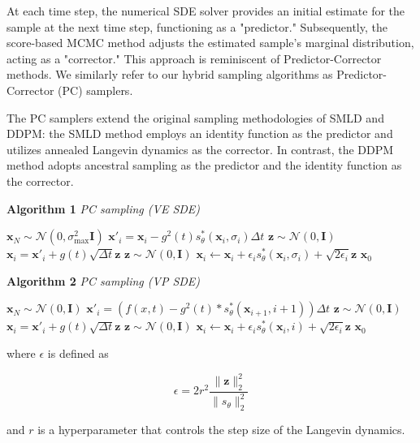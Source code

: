 At each time step, the numerical SDE solver provides an initial estimate for the sample at the next time step, functioning as a "predictor." Subsequently, the score-based MCMC method adjusts the estimated sample's marginal distribution, acting as a "corrector." This approach is reminiscent of Predictor-Corrector methods. We similarly refer to our hybrid sampling algorithms as Predictor-Corrector (PC) samplers.

The PC samplers extend the original sampling methodologies of SMLD and DDPM: the SMLD method employs an identity function as the predictor and utilizes annealed Langevin dynamics as the corrector. In contrast, the DDPM method adopts ancestral sampling as the predictor and the identity function as the corrector.

\noindent\textbf{Algorithm 1} \textit{PC sampling (VE SDE)}
\begin{algorithmic}[1]
    \STATE $\mathbf{x}_N \sim \mathcal{N}(0, \sigma_{\max}^2 \mathbf{I})$
        \STATE $\mathbf{x}'_i = \mathbf{x}_i -g^2(t)s_\theta^* \left( \mathbf{x}_i, \sigma_i \right) {\Delta t}$
        \STATE $\mathbf{z} \sim \mathcal{N}(0, \mathbf{I})$
        \STATE $\mathbf{x}_i = \mathbf{x}'_i +g(t) \sqrt{\Delta t} \mathbf{z}$
            \STATE $\mathbf{z} \sim \mathcal{N}(0, \mathbf{I})$
            \STATE $\mathbf{x}_i \leftarrow \mathbf{x}_i + \epsilon_i s_\theta^* \left( \mathbf{x}_i, \sigma_i \right) + \sqrt{2 \epsilon_i} \mathbf{z}$
        \ENDFOR
    \ENDFOR
    \RETURN $\mathbf{x}_0$
\end{algorithmic}

\bigskip

\noindent\textbf{Algorithm 2} \textit{PC sampling (VP SDE)}
\begin{algorithmic}[1]
    \STATE $\mathbf{x}_N \sim \mathcal{N}(0, \mathbf{I})$
        \STATE $\mathbf{x}'_i = (f(x,t)-g^2(t)*s_\theta^* \left( \mathbf{x}_{i+1}, i+1 \right)) {\Delta t}$
        \STATE $\mathbf{z} \sim \mathcal{N}(0, \mathbf{I})$
        \STATE $\mathbf{x}_i = \mathbf{x}'_i +g(t) \sqrt{\Delta t} \mathbf{z}$
            \STATE $\mathbf{z} \sim \mathcal{N}(0, \mathbf{I})$
            \STATE $\mathbf{x}_i \leftarrow \mathbf{x}_i + \epsilon_i s_\theta^* \left( \mathbf{x}_i, i \right) + \sqrt{2 \epsilon_i} \mathbf{z}$
        \ENDFOR
    \ENDFOR
    \RETURN $\mathbf{x}_0$
\end{algorithmic}

where $\epsilon$ is defined as 

\begin{equation}
    \epsilon = 2 r^2 \frac{\|\mathbf{z}\|_2^2}{\|s_\theta\|_2^2}
\end{equation}

and $r$ is a hyperparameter that controls the step size of the Langevin dynamics.







